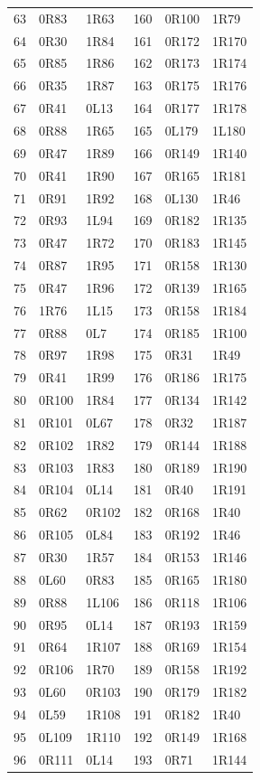 \begin{longtable}{@{}rllrll@{}}
63 & 0R83 & 1R63 & 160 & 0R100 & 1R79\\
64 & 0R30 & 1R84 & 161 & 0R172 & 1R170\\
65 & 0R85 & 1R86 & 162 & 0R173 & 1R174\\
66 & 0R35 & 1R87 & 163 & 0R175 & 1R176\\
67 & 0R41 & 0L13 & 164 & 0R177 & 1R178\\
68 & 0R88 & 1R65 & 165 & 0L179 & 1L180\\
69 & 0R47 & 1R89 & 166 & 0R149 & 1R140\\
70 & 0R41 & 1R90 & 167 & 0R165 & 1R181\\
71 & 0R91 & 1R92 & 168 & 0L130 & 1R46\\
72 & 0R93 & 1L94 & 169 & 0R182 & 1R135\\
73 & 0R47 & 1R72 & 170 & 0R183 & 1R145\\
74 & 0R87 & 1R95 & 171 & 0R158 & 1R130\\
75 & 0R47 & 1R96 & 172 & 0R139 & 1R165\\
76 & 1R76 & 1L15 & 173 & 0R158 & 1R184\\
77 & 0R88 & 0L7 & 174 & 0R185 & 1R100\\
78 & 0R97 & 1R98 & 175 & 0R31 & 1R49\\
79 & 0R41 & 1R99 & 176 & 0R186 & 1R175\\
80 & 0R100 & 1R84 & 177 & 0R134 & 1R142\\
81 & 0R101 & 0L67 & 178 & 0R32 & 1R187\\
82 & 0R102 & 1R82 & 179 & 0R144 & 1R188\\
83 & 0R103 & 1R83 & 180 & 0R189 & 1R190\\
84 & 0R104 & 0L14 & 181 & 0R40 & 1R191\\
85 & 0R62 & 0R102 & 182 & 0R168 & 1R40\\
86 & 0R105 & 0L84 & 183 & 0R192 & 1R46\\
87 & 0R30 & 1R57 & 184 & 0R153 & 1R146\\
88 & 0L60 & 0R83 & 185 & 0R165 & 1R180\\
89 & 0R88 & 1L106 & 186 & 0R118 & 1R106\\
90 & 0R95 & 0L14 & 187 & 0R193 & 1R159\\
91 & 0R64 & 1R107 & 188 & 0R169 & 1R154\\
92 & 0R106 & 1R70 & 189 & 0R158 & 1R192\\
93 & 0L60 & 0R103 & 190 & 0R179 & 1R182\\
94 & 0L59 & 1R108 & 191 & 0R182 & 1R40\\
95 & 0L109 & 1R110 & 192 & 0R149 & 1R168\\
96 & 0R111 & 0L14 & 193 & 0R71 & 1R144\\
\bottomrule\end{longtable}\endgroup
